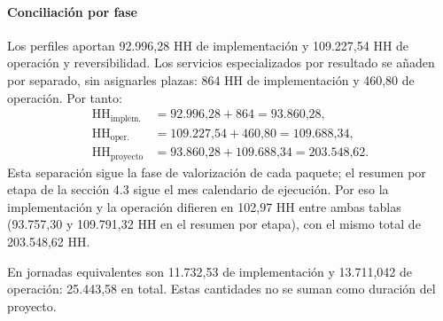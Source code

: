 \paragraph{Conciliación por fase}
Los perfiles aportan 92.996,28 HH de implementación y 109.227,54 HH de operación y reversibilidad. Los servicios especializados por resultado se añaden por separado, sin asignarles plazas: 864 HH de implementación y 460,80 de operación. Por tanto:
\[
\begin{aligned}
\text{HH}_{\text{implem.}}&=\text{92.996,28}+864=\text{93.860,28},\\
\text{HH}_{\text{oper.}}&=\text{109.227,54}+\text{460,80}=\text{109.688,34},\\
\text{HH}_{\text{proyecto}}&=\text{93.860,28}+\text{109.688,34}=\text{203.548,62}.
\end{aligned}
\]
Esta separación sigue la fase de valorización de cada paquete; el resumen por etapa de la sección 4.3 sigue el mes calendario de ejecución. Por eso la implementación y la operación difieren en 102,97 HH entre ambas tablas (93.757,30 y 109.791,32 HH en el resumen por etapa), con el mismo total de 203.548,62 HH.

En jornadas equivalentes son 11.732,53 de implementación y 13.711,042 de operación: 25.443,58 en total. Estas cantidades no se suman como duración del proyecto.
